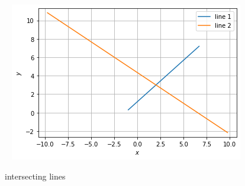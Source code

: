 \documentclass[journal,12pt,twocolumn]{IEEEtran}
\begin{document}
\begin{enumerate}
\begin{figure}[!ht]
   \includegraphics[width=\columnwidth]{figure2(2).png}
    \caption{intersecting lines}
    \label{fig: intersecting lines.}
\end{figure}    
\end{enumerate}
\end{document}

